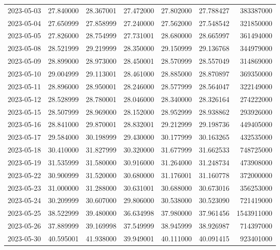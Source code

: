 \begin{tabular}{lrrrrrr}
2023-05-03 &   27.840000 &   28.367001 &   27.472000 &   27.802000 &   27.788427 &   383387000 \\
2023-05-04 &   27.650999 &   27.858999 &   27.240000 &   27.562000 &   27.548542 &   321850000 \\
2023-05-05 &   27.826000 &   28.754999 &   27.731001 &   28.680000 &   28.665997 &   361494000 \\
2023-05-08 &   28.521999 &   29.219999 &   28.350000 &   29.150999 &   29.136768 &   344979000 \\
2023-05-09 &   28.899000 &   28.973000 &   28.450001 &   28.570999 &   28.557049 &   314869000 \\
2023-05-10 &   29.004999 &   29.113001 &   28.461000 &   28.885000 &   28.870897 &   369350000 \\
2023-05-11 &   28.896000 &   28.950001 &   28.246000 &   28.577999 &   28.564047 &   322149000 \\
2023-05-12 &   28.528999 &   28.780001 &   28.046000 &   28.340000 &   28.326164 &   274222000 \\
2023-05-15 &   28.507999 &   28.969000 &   28.152000 &   28.952999 &   28.938862 &   293926000 \\
2023-05-16 &   28.841000 &   29.870001 &   28.832001 &   29.212999 &   29.198736 &   449405000 \\
2023-05-17 &   29.584000 &   30.198999 &   29.430000 &   30.177999 &   30.163265 &   432535000 \\
2023-05-18 &   30.410000 &   31.827999 &   30.320000 &   31.677999 &   31.662533 &   748725000 \\
2023-05-19 &   31.535999 &   31.580000 &   30.916000 &   31.264000 &   31.248734 &   473908000 \\
2023-05-22 &   30.900999 &   31.520000 &   30.680000 &   31.176001 &   31.160778 &   372000000 \\
2023-05-23 &   31.000000 &   31.288000 &   30.631001 &   30.688000 &   30.673016 &   356253000 \\
2023-05-24 &   30.209999 &   30.607000 &   29.806000 &   30.538000 &   30.523090 &   721419000 \\
2023-05-25 &   38.522999 &   39.480000 &   36.634998 &   37.980000 &   37.961456 &  1543911000 \\
2023-05-26 &   37.889999 &   39.169998 &   37.549999 &   38.945999 &   38.926987 &   714397000 \\
2023-05-30 &   40.595001 &   41.938000 &   39.949001 &   40.111000 &   40.091415 &   923401000 \\

\end{tabular}
